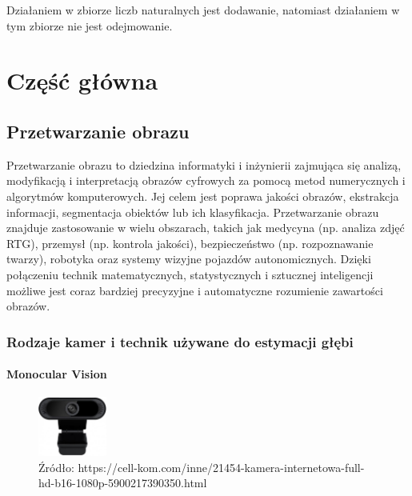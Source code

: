 \documentclass[magisterska]{pracadypl}
\begin{document}
  Działaniem w zbiorze liczb naturalnych jest dodawanie, natomiast działaniem w tym zbiorze nie jest odejmowanie.


\chapter{Część główna}

\section{Przetwarzanie obrazu}

Przetwarzanie obrazu to dziedzina informatyki i inżynierii zajmująca się analizą, modyfikacją i interpretacją obrazów cyfrowych za pomocą metod numerycznych i algorytmów komputerowych. Jej celem jest poprawa jakości obrazów, ekstrakcja informacji, segmentacja obiektów lub ich klasyfikacja. Przetwarzanie obrazu znajduje zastosowanie w wielu obszarach, takich jak medycyna (np. analiza zdjęć RTG), przemysł (np. kontrola jakości), bezpieczeństwo (np. rozpoznawanie twarzy), robotyka oraz systemy wizyjne pojazdów autonomicznych. Dzięki połączeniu technik matematycznych, statystycznych i sztucznej inteligencji możliwe jest coraz bardziej precyzyjne i automatyczne rozumienie zawartości obrazów.

\subsection{Rodzaje kamer i technik używane do estymacji głębi}

\subsubsection{Monocular Vision}

\begin{figure}[h]  %
    \centering  %
    \includegraphics[width=0.2\textwidth]{images/MONO.png}  %
    \captionsetup{labelformat=empty, font=footnotesize}
    \caption{Źródło: https://cell-kom.com/inne/21454-kamera-internetowa-full-hd-b16-1080p-5900217390350.html}
    \label{fig:mono}  %
\end{figure}
\end{document}
